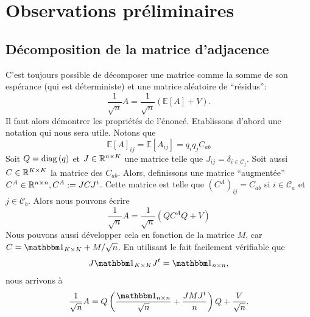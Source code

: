 \documentclass[../../main.tex]{subfiles} %
\begin{document}
\section{Observations préliminaires}

\subsection{Décomposition de la matrice d'adjacence} 
C'est toujours possible de décomposer une matrice comme la somme de son 
espérance (qui est déterministe) et une matrice aléatoire de ``résidus'':
\[
	\frac{1}{\sqrt{n}} A = \frac{1}{\sqrt{n}} \left( \mathbb E 
	\left[ A \right] + V \right).
\]
Il faut alors démontrer les propriétés de l'énoncé. Etablissons d'abord une 
notation qui nous sera utile. Notons que
\begin{equation}
	\mathbb E \left[ A \right]_{ij} = \mathbb E \left[ A_{ij} \right] 
	= q_i q_j C_{ab}
	\label{eq:decompA}
\end{equation}
Soit $Q = \operatorname{diag} \left( q \right)$ et $J \in \mathbb R^{n \times K}$ une matrice telle que $J_{ij} 
= \delta_{i \in \mathcal{C}_j}$. Soit aussi $C \in \mathbb R^{K \times K}$ la matrice 
des $C_{ab}$. Alors, definissons une matrice ``augmentée'' $C^A \in 
\mathbb R^{n \times n}, C^A := JCJ^t$. Cette matrice est telle que 
$\left(C^A \right)_{ij} = C_{ab}$ si $i \in \mathcal{C}_a$ et 
$j \in \mathcal{C}_b$. Alors nous pouvons écrire
\begin{equation*}
	\frac{1}{\sqrt n} A = \frac{1}{\sqrt n} \left( Q C^A Q + V \right)
\end{equation*}
Nous pouvons aussi développer cela en fonction de la matrice $M$, car 
$C = \ones{K \times K} + M/ \sqrt n$. En utilisant le fait facilement vérifiable
que
\begin{equation}
	J \ones{K \times K} J^t = \ones{n \times n},
	\label{eq:ones}
\end{equation}
nous arrivons à
\begin{equation*}
	\frac{1}{\sqrt n} A = Q \left( \frac{\ones{n \times n}} {\sqrt n} 
	+ \frac{J M J^t }{n} \right) Q + \frac{V}{\sqrt n}.
\end{equation*}
\end{document}
